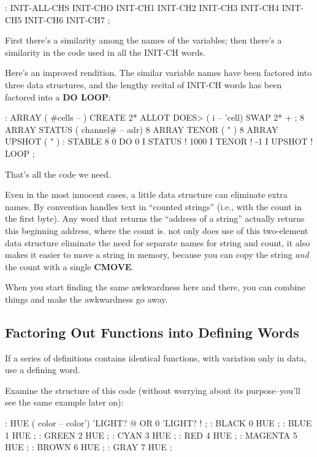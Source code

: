 \begin{Code} 
: INIT-ALL-CHS    INIT-CHO  INIT-CH1  INIT-CH2  INIT-CH3
   INIT-CH4  INIT-CH5  INIT-CH6  INIT-CH7 ;
\end{Code}
First there's a similarity among the names of the variables; then there's a similarity in the code used in all the INIT-CH words.

Here's an improved rendition. The similar variable names have been factored into three data structures, and the lengthy recital of INIT-CH words has been factored into a \textbf{DO LOOP}:

\begin{Code}
: ARRAY  ( #cells -- )  CREATE  2* ALLOT
   DOES> ( i -- 'cell)  SWAP  2* + ; 
8 ARRAY STATUS  ( channel# -- adr)
8 ARRAY TENOR   (        "       )
8 ARRAY UPSHOT  (        "       )
: STABLE   8 0 DO  0 I STATUS !  1000 I TENOR ! 
   -1 I UPSHOT !  LOOP ;
\end{Code}

\noindent That's all the code we need.

Even in the most innocent cases, a little data structure can eliminate extra names. By convention \Forth{} handles text in ``counted strings'' (i.e., with the count in the first byte). Any word that returns the ``address of a string'' actually returns this beginning address, where the count is. not only does use of this two-element data structure eliminate the need for separate names for string and count, it also makes it easier to move a string in memory, because you can copy the string \emph{and} the count
with a single \textbf{CMOVE}.

When you start finding the same awkwardness here and there, you can combine things and make the awkwardness go away.

\subsection{{Factoring Out Functions into Defining Words}}

\begin{tip}
If a series of definitions contains identical functions, with variation only in data, use a defining word.
\end{tip}
Examine the structure of this code (without worrying about its purpose--you'll see the same example later on):

\begin{Code}
: HUE  ( color -- color') 
   'LIGHT? @  OR  0 'LIGHT? ! ;
: BLACK   0 HUE ;
: BLUE   1 HUE ;
: GREEN   2 HUE ;
: CYAN   3 HUE ;
: RED   4 HUE ;
: MAGENTA   5 HUE ;
: BROWN   6 HUE ;
: GRAY   7 HUE ;
\end{Code}

